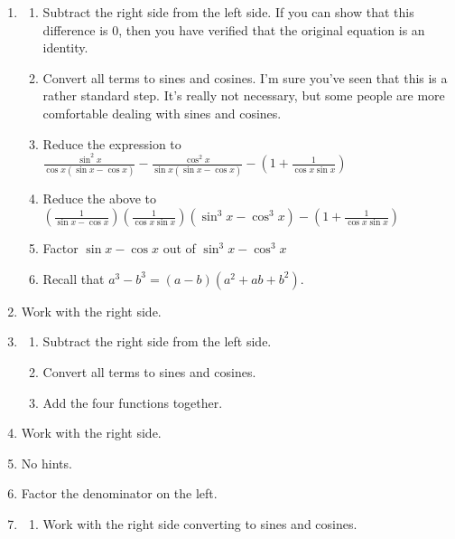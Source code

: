 \documentclass[english]{book}
\begin{document}
\begin{enumerate}
\begin{enumerate}
\begin{enumerate}[\hspace{1cm}a)]
                \item Add the fractions.
              \end{enumerate}
        \item \begin{enumerate}[\hspace{1cm}a)]
                \item Subtract the right side from the left side. If you can show that this difference is $0$, then you have verified that the original equation is an identity.
                \item Convert all terms to sines and cosines. I'm sure you've seen that this is a rather standard step. It's really not necessary, but some people are more comfortable dealing with sines and cosines.
                \item Reduce the expression to $\frac{\sin^{2} x}{\cos x (\sin x - \cos x)} - \frac{\cos^{2} x}{\sin x (\sin x - \cos x)} - (1+ \frac{1}{\cos x  \sin x})$
                \item Reduce the above to $(\frac{1}{\sin x - \cos x}) (\frac{1}{\cos x  \sin x}) (\sin^{3} x - \cos^{3} x) - (1+ \frac{1}{\cos x  \sin x})$
                \item Factor $\sin x - \cos x $ out of $\sin^{3} x - \cos^{3} x$
                \item Recall that $a^3 - b^3 = (a-b) (a^2 +ab + b^2)$.
              \end{enumerate}
        \item Work with the right side.
        \item \begin{enumerate}[\hspace{1cm}a)]
                \item Subtract the right side from  the left side.
                \item Convert all terms to sines and cosines.
                \item Add the four functions together.
              \end{enumerate}
        \item Work with the right side.
        \item No hints.
        \item Factor the denominator on the left.
        \item \begin{enumerate}[\hspace{1cm}a)]
                \item Work with the right side converting to sines and cosines.

\end{enumerate}
\end{enumerate}
\end{enumerate}
\end{document}
